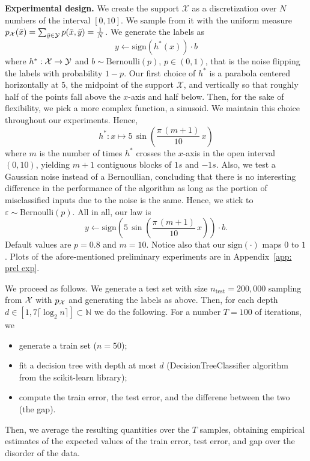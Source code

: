 \documentclass[reqno]{amsart}
\begin{document}
{\bf Experimental design.} 
We create the support $\mathcal X$ as a discretization over $N$ numbers of the interval $[0,10]$. We sample from it with the uniform measure $p_{\mathcal{X}}(\bar x) = \sum_{\bar y\in \mathcal{Y}}p(\bar x, \bar y) = \frac{1}{N}$. 
We generate the labels as
\[
y \leftarrow \mathrm{sign}(h^*(x)) \cdot b
\] 
where $h^*:\mathcal{X}\to\mathcal{Y}$ and $b\sim\mathrm{Bernoulli}(p)$, $p\in(0,1)$, that is the noise flipping the labels with probability $1-p$. 
Our first choice of $h^*$ is a parabola centered horizontally at $5$, the midpoint of the support $\mathcal X$, and vertically so that roughly half of the points fall above the $x$-axis and half below. Then, for the sake of flexibility, we pick a more complex function, a sinusoid. We maintain this choice throughout our experiments. Hence, 
\[
    h^*: x \mapsto 5\, \sin\left(\frac{\pi \,( m  +1)}{10}\, x\right)
\]
where $m$ is the number of times $h^*$ crosses the $x$-axis in the open interval $(0,10)$, yielding $m+1$ contiguous blocks of $1s$ and $-1s$. 
Also, we test a Gaussian noise instead of a Bernoullian, concluding that there is no interesting difference in the performance of the algorithm as long as the portion of misclassified inputs due to the noise is the same. Hence, we stick to $\varepsilon \sim \mathrm{Bernoulli}(p)$. All in all, our law is
 \[
    y \leftarrow \mathrm{sign}\left(5\, \sin\left(\frac{\pi \,( m  +1)}{10}\, x\right)\right)\cdot b.
 \]
 Default values are $p = 0.8$ and $m = 10$. Notice also that our $\mathrm{sign}(\cdot)$ maps $0$ to $1$. Plots of the afore-mentioned preliminary experiments are in Appendix~\ref{app: prel exp}.

We proceed as follows. We generate a test set with size $n_\text{test} = 200,000$ sampling from $\mathcal{X}$ with $p_{\mathcal{X}}$ and generating the labels as above. Then, for each depth $d \in [1, 7\lceil{\log_2 n}\rceil] \subset \mathbb N$ we do the following. For a number $T=100$ of iterations, we 
\begin{itemize}
    \item[$\cdot$] generate a train set ($n= 50$);
    \item[$\cdot$] fit a decision tree with depth at most $d$ (DecisionTreeClassifier algorithm from the scikit-learn library);
    \item[$\cdot$] compute the train error, the test error, and the differene between the two (the gap).
\end{itemize}
Then, we average the resulting quantities over the $T$ samples, obtaining empirical estimates of the expected values of the train error, test error, and gap over the disorder of the data. 
\end{document}
